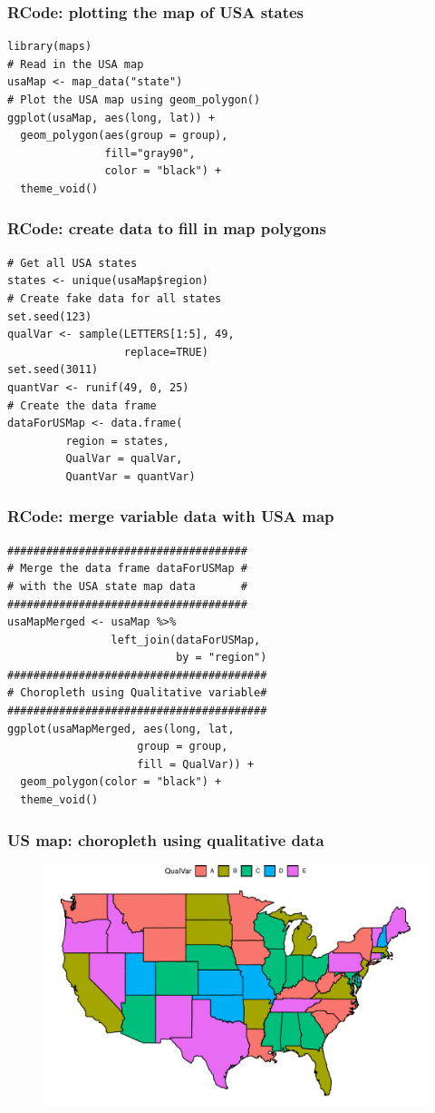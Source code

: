 \documentclass{beamer}
\begin{document}
\begin{frame}[fragile]\frametitle{RCode: plotting the map of USA states}
\begin{lstlisting}
library(maps)
# Read in the USA map
usaMap <- map_data("state")
# Plot the USA map using geom_polygon()
ggplot(usaMap, aes(long, lat)) +
  geom_polygon(aes(group = group),
               fill="gray90",
               color = "black") +
  theme_void() 
\end{lstlisting}
\end{frame}

\begin{frame}[fragile]\frametitle{RCode: create data to fill in map polygons}
\begin{lstlisting}
# Get all USA states
states <- unique(usaMap$region)
# Create fake data for all states
set.seed(123)
qualVar <- sample(LETTERS[1:5], 49, 
                  replace=TRUE)
set.seed(3011)
quantVar <- runif(49, 0, 25)
# Create the data frame
dataForUSMap <- data.frame(
         region = states,
         QualVar = qualVar,
         QuantVar = quantVar)
\end{lstlisting}
\end{frame}

\begin{frame}[fragile]\frametitle{RCode: merge variable data with USA map}
\begin{lstlisting}
#####################################
# Merge the data frame dataForUSMap #
# with the USA state map data       #
#####################################
usaMapMerged <- usaMap %>%
                left_join(dataForUSMap,
                          by = "region")
########################################
# Choropleth using Qualitative variable#
########################################                          
ggplot(usaMapMerged, aes(long, lat,
                    group = group,
                    fill = QualVar)) +
  geom_polygon(color = "black") +
  theme_void()
\end{lstlisting}
\end{frame}

\begin{frame}\frametitle{US map: choropleth using qualitative data}
\begin{figure}
\includegraphics[width=0.99\linewidth]{PlotsLec4/UsaChoroplethQual}
\end{figure}
\end{frame}
\end{document}
